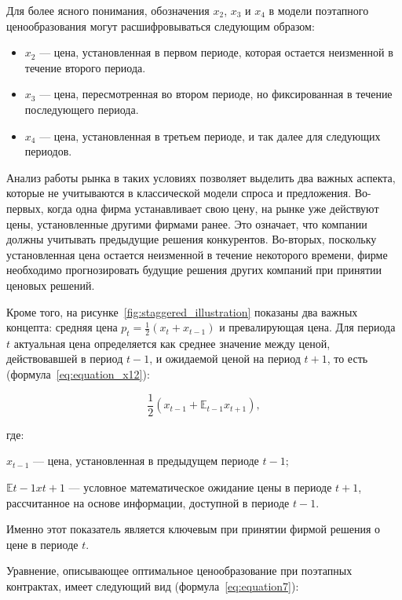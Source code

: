 Для более ясного понимания, обозначения \(x_2\), \(x_3\) и \(x_4\) в модели поэтапного ценообразования могут расшифровываться следующим образом:

\begin{itemize}
	\item \( x_2 \) — цена, установленная в первом периоде, которая остается неизменной в течение второго периода.
	\item \( x_3 \) — цена, пересмотренная во втором периоде, но фиксированная в течение последующего периода.
	\item \( x_4 \) — цена, установленная в третьем периоде, и так далее для следующих периодов.
\end{itemize}


Анализ работы рынка в таких условиях позволяет выделить два важных аспекта, которые не учитываются в классической модели спроса и предложения. Во-первых, когда одна фирма устанавливает свою цену, на рынке уже действуют цены, установленные другими фирмами ранее. Это означает, что компании должны учитывать предыдущие решения конкурентов. Во-вторых, поскольку установленная цена остается неизменной в течение некоторого времени, фирме необходимо прогнозировать будущие решения других компаний при принятии ценовых решений.

Кроме того, на рисунке~\cref{fig:staggered_illustration} показаны два важных концепта: средняя цена \( p_t = \frac{1}{2}(x_t + x_{t-1}) \) и превалирующая цена. Для периода \( t \) актуальная цена определяется как среднее значение между ценой, действовавшей в период \( t-1 \), и ожидаемой ценой на период \( t+1 \), то есть (формула~\eqref{eq:equation_x12}):

\begin{equation}
	\label{eq:equation_x12}
	\frac{1}{2}(x_{t-1} + \mathbb{E}_{t-1}x_{t+1}),
\end{equation}

где:
\par
$x_{t-1}$ — цена, установленная в предыдущем периоде $t-1$;
\par
$\mathbb{E}{t-1}x{t+1}$ — условное математическое ожидание цены в периоде $t+1$, рассчитанное на основе информации, доступной в периоде $t-1$.

Именно этот показатель является ключевым при принятии фирмой решения о цене в периоде \( t \).

Уравнение, описывающее оптимальное ценообразование при поэтапных контрактах, имеет следующий вид (формула~\eqref{eq:equation7}):

